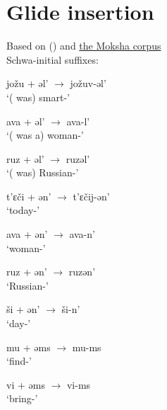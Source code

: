 \documentclass[a4paper, 12pt]{article}
\newcommand{\citeay}[2][]{
   \citeauthor{#2} (\citeyear[#1]{#2})}
\begin{document}
	\section{Glide insertion}
	
	Based on \citeay{kozlov2018} and \href{http://moksha.web-corpora.net}{the Moksha corpus}\\
	
	Schwa-initial suffixes:
	
\begin{minipage}[t]{.3\linewidth}
\ex\label{ex:u1}
	jožu + əl' $\rightarrow$ jožuv-əl' \\`({\Tsg} was) smart-{\Ipf}'
\xe
\end{minipage}
\hfill
\begin{minipage}[t]{.315\linewidth}
\ex\label{ex:a1}
	ava + əl' $\rightarrow$ ava-l' \\`({\Tsg} was a) woman-{\Ipf}'
\xe
\end{minipage}	
\hfill
\begin{minipage}[t]{.33\linewidth}
\ex\label{ex:z1}
	ruz + əl' $\rightarrow$ ruzəl' \\`({\Tsg} was) Russian-{\Ipf}'
\xe
\end{minipage}

\begin{minipage}[t]{.3\linewidth}
\ex\label{ex:u2}
	t'ɛči + ən' $\rightarrow$ t'ɛčij-ən' \\`today-{\Gen}'
\xe
\end{minipage}	
\hfill
\begin{minipage}[t]{.315\linewidth}
\ex\label{ex:a2}
	ava + ən' $\rightarrow$ ava-n' \\`woman-{\Gen}'
\xe
\end{minipage}	
\hfill
\begin{minipage}[t]{.33\linewidth}
\ex\label{ex:z2}
	ruz + ən' $\rightarrow$ ruzən' \\`Russian-{\Gen}'
\xe
\end{minipage}

\begin{minipage}[t]{.3\linewidth}
\ex\label{ex:mono1}
	ši + ən' $\rightarrow$ ši-n' \\`day-{\Gen}'
\xe
\end{minipage}
\hfill
\begin{minipage}[t]{.315\linewidth}
\ex\label{ex:}
	mu + əms $\rightarrow$ mu-ms \\`find-{\Inf}'
\xe
\end{minipage}	
\hfill
\begin{minipage}[t]{.33\linewidth}
\ex\label{ex:mono2}
	vi + əms $\rightarrow$ vi-ms \\`bring-{\Inf}'
\xe
\end{minipage}
\end{document}
